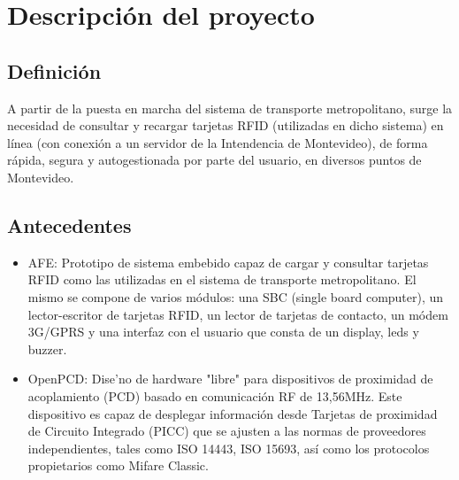 \chapter{Descripci\'on del proyecto}

\section{Definici\'on}

A partir de la puesta en marcha del sistema de transporte metropolitano, surge la necesidad de consultar y recargar tarjetas RFID (utilizadas en dicho sistema) en l\'inea (con conexi\'on a un servidor de la Intendencia de Montevideo), de forma r\'apida, segura y autogestionada por parte del usuario, en diversos puntos de Montevideo.

\section{Antecedentes}

\begin{itemize}

\item AFE: Prototipo de sistema embebido capaz de cargar y consultar tarjetas RFID como las utilizadas en el sistema de transporte metropolitano. El mismo se compone de varios m\'odulos: una SBC (single board computer), un lector-escritor de tarjetas RFID, un lector de tarjetas de contacto, un m\'odem 3G/GPRS y una interfaz con el usuario que consta de un display, leds y buzzer.

\item OpenPCD: Dise'no de hardware "libre"  para dispositivos de proximidad de acoplamiento (PCD) basado en comunicaci\'on RF de 13,56MHz. Este dispositivo es capaz de desplegar informaci\'on desde Tarjetas de proximidad de Circuito Integrado (PICC) que se ajusten a las normas de proveedores independientes, tales como ISO 14443, ISO 15693, as\'i como los protocolos propietarios como Mifare Classic.

\end{itemize}